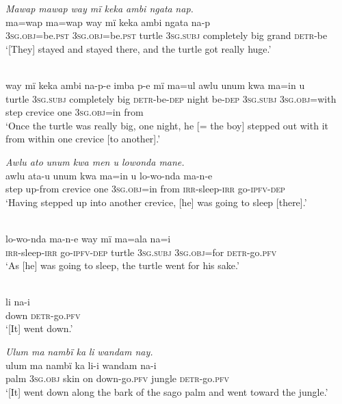 \ex \textit{Mawap mawap way mï keka ambi ngata} {\textit{n}}\textit{ap.}\\
\gll ma{=}wap      ma{=}wap      way  mï      keka      ambi ngata  na{{}-}p\\
3\textsc{sg.obj}=be.\textsc{pst}  \textsc{3sg.obj}=be.\textsc{pst}  turtle  3\textsc{sg.subj}  completely  big grand  \textsc{detr}{}-be\\
\glt ‘[They] stayed and stayed there, and the turtle got really huge.’

\\
\gll way  mï      keka      ambi na{{}-}p{{}-}e      imba  p{{}-}e mï      m{a=u}l      awlu  unum    kwa  m{a=i}n      u\\
turtle  3\textsc{sg.subj}  completely  big    \textsc{detr}{}-be-\textsc{dep}  night  be-\textsc{dep} 3\textsc{sg.subj}  3\textsc{sg.obj}=with  step  crevice    one    3\textsc{sg.obj}=in  from\\
\glt ‘Once the turtle was really big, one night, he [= the boy] stepped out with it from within one crevice [to another].’

\ex \textit{Awlu at}{\textit{o}} \textit{unum kwa men u lowonda mane.}\\
\gll awlu  at{a-u} unum    kwa  m{a=i}n      u    l{o-}w{o-}nda ma{{}-}n{{}-}e\\
step  up-from  crevice    one    3\textsc{sg.obj}=in  from  \textsc{irr}{}-sleep-\textsc{irr} go-\textsc{ipfv-dep}\\
\glt ‘Having stepped up into another crevice, [he] was going to sleep [there].’

\\
\gll l{o-}w{o-}nda    ma{{}-}n{{}-}e      way  mï      ma=ala       n{a=i}\\
\textsc{irr}{}-sleep-\textsc{irr}  go-\textsc{ipfv-dep}  turtle  3\textsc{sg.subj}  \textsc{3sg.obj}=for  \textsc{detr-}go.\textsc{pfv}\\
\glt ‘As [he] was going to sleep, the turtle went for his sake.’

\\
\gll li    n{a-i}\\
down  \textsc{detr}{}-go.\textsc{pfv}\\
\glt ‘[It] went down.’

\ex \textit{Ulum m}{\textit{a}} \textit{nambï k}{\textit{a}} \textit{l}{\textit{i}} \textit{wandam nay.}\\
\gll ulum  m{a} nambï  k{a} li-i wandam  na{{}-i}\\
palm  3\textsc{sg}.\textsc{obj}  skin  on  down-go.\textsc{pfv}  jungle    \textsc{detr}{}-go.\textsc{pfv}\\
\glt ‘[It] went down along the bark of the sago palm and went toward the jungle.’

